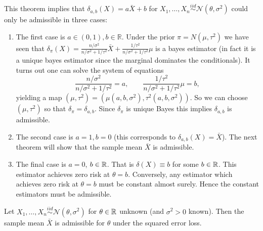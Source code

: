 \noindent This theorem implies that  $\delta_{a,b}(X) = a\bar{X} + b$ for $X_1, \dots, X_n \overset{iid}{\sim} \mathcal N(\theta, \sigma^2)$ could only be admissible in three cases:
\begin{enumerate}
	\item[(a)] The first case is $a \in (0, 1), b \in \mathbb{R}$. Under the prior $\pi = N(\mu, \tau^2)$ we have seen that $\delta_\pi(X) =  \frac{n/\sigma^2}{n/\sigma^2 + 1/\tau^2} \bar{X} + \frac{1/\tau^2}{n/\sigma^2 + 1/\tau^2} \mu$ is a bayes estimator (in fact it is a unique bayes estimator since the marginal dominates the conditionals). It turns out one can solve the system of equations \[
		 \frac{n/\sigma^2}{n/\sigma^2 + 1/\tau^2} = a, \qquad \frac{1/\tau^2}{n/\sigma^2 + 1/\tau^2} \mu = b,
	\] yielding a map $(\mu, \tau^2) = (\mu(a, b, \sigma^2), \tau^2(a, b, \sigma^2))$. So we can choose $(\mu, \tau^2)$ so that $\delta_\pi = \delta_{a,b}$. Since $\delta_{\pi}$ is unique Bayes this implies $\delta_{a,b}$ is admissible.
	\item[(b)] The second case is $a = 1, b = 0$ (this corresponds to $\delta_{a,b}(X) = \bar{X}$). The next theorem will show that the sample mean $\bar{X}$ is admissible.
	\item[(c)] The final case is $a = 0$, $b \in \mathbb{R}$. That is $\delta(X) \equiv b$ for some $b \in \mathbb{R}$. This estimator achieves zero risk at $\theta = b$. Conversely, any estimator which achieves zero risk at $\theta = b$ must be constant almost surely. Hence the constant estimators must be admissible.
	
	
\end{enumerate}

\begin{theorem}
	Let $X_1, \dots, X_n \overset{iid}{\sim} \mathcal N(\theta, \sigma^2)$ for $\theta \in \mathbb{R}$ unknown (and $\sigma^2 > 0$ known). Then the sample mean $\bar{X}$ is admissible for $\theta$ under the squared error loss.
\end{theorem}

